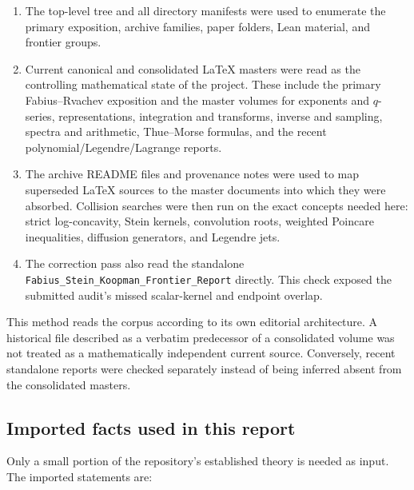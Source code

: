 \documentclass[11pt,oneside]{article}
\theoremstyle{definition}
\theoremstyle{remark}
\begin{document}
\begin{enumerate}
\item The top-level tree and all directory manifests were used to enumerate the
primary exposition, archive families, paper folders, Lean material, and frontier
groups.
\item Current canonical and consolidated LaTeX masters were read as the controlling
mathematical state of the project.  These include the primary Fabius--Rvachev
exposition and the master volumes for exponents and $q$-series, representations,
integration and transforms, inverse and sampling, spectra and arithmetic,
Thue--Morse formulas, and the recent polynomial/Legendre/Lagrange reports.
\item The archive README files and provenance notes were used to map superseded
LaTeX sources to the master documents into which they were absorbed.  Collision
searches were then run on the exact concepts needed here: strict log-concavity,
Stein kernels, convolution roots, weighted Poincare inequalities, diffusion
generators, and Legendre jets.
\item The correction pass also read the standalone
\texttt{Fabius\_Stein\_Koopman\_Frontier\_Report} directly.  This check exposed
the submitted audit's missed scalar-kernel and endpoint overlap.
\end{enumerate}

This method reads the corpus according to its own editorial architecture.  A
historical file described as a verbatim predecessor of a consolidated volume was
not treated as a mathematically independent current source.  Conversely, recent
standalone reports were checked separately instead of being inferred absent from
the consolidated masters.

\subsection{Imported facts used in this report}
Only a small portion of the repository's established theory is needed as input.
The imported statements are:
\end{document}
